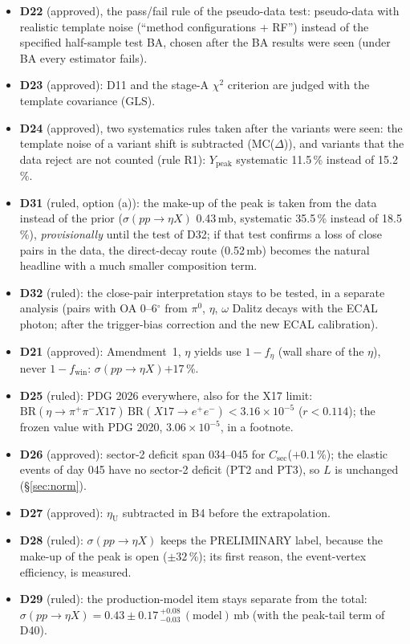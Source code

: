 \documentclass[11pt,a4paper]{article}
\newcommand{\piz}{\ensuremath{\pi^{0}}\xspace}
\newcommand{\ee}{\ensuremath{e^{+}e^{-}}\xspace}
\newcommand{\pipi}{\ensuremath{\pi^{+}\pi^{-}}\xspace}
\newcommand{\Ypeak}{\ensuremath{Y_{\mathrm{peak}}}\xspace}
\newcommand{\Csec}{\ensuremath{C_{\mathrm{sec}}}\xspace}
\newcommand{\feta}{\ensuremath{f_\eta}\xspace}
\newcommand{\fwin}{\ensuremath{f_{\mathrm{win}}}\xspace}
\newcommand{\sigeta}{\ensuremath{\sigma(pp\to\eta X)}\xspace}
\newcommand{\BRX}{\ensuremath{\mathrm{BR}(\eta\to\pipi X17)\,\mathrm{BR}(X17\to\ee)}\xspace}
\begin{document}
\begin{itemize}\setlength{\itemsep}{1pt}
\item \textbf{D22} (approved), the pass/fail rule of the pseudo-data test: pseudo-data with realistic template noise (``method
      configurations + RF'') instead of the specified half-sample test BA, chosen after the BA results were seen (under BA every estimator fails).
\item \textbf{D23} (approved): D11 and the stage-A $\chi^2$ criterion are judged with the template covariance (GLS).
\item \textbf{D24} (approved), two systematics rules taken after the variants were seen: the template noise of a variant shift is
      subtracted (MC($\Delta$)), and variants that the data reject are not counted (rule R1): \Ypeak systematic 11.5\,\% instead of 15.2\,\%.
\item \textbf{D31} (ruled, option (a)): the make-up of the peak is taken from the data instead of the prior (\sigeta 0.43\,mb, systematic
      35.5\,\% instead of 18.5\,\%), \emph{provisionally} until the test of D32; if that test confirms a loss of close pairs in the data, the
      direct-decay route (0.52\,mb) becomes the natural headline with a much smaller composition term.
\item \textbf{D32} (ruled): the close-pair interpretation stays to be tested, in a separate analysis (pairs with OA 0--6$^\circ$ from \piz,
      $\eta$, $\omega$ Dalitz decays with the ECAL photon; after the trigger-bias correction and the new ECAL calibration).
\item \textbf{D21} (approved): Amendment~1, $\eta$ yields use $1-\feta$ (wall share of the $\eta$), never $1-\fwin$: \sigeta $+17$\,\%.
\item \textbf{D25} (ruled): PDG 2026 everywhere, also for the X17 limit: $\BRX<3.16\times10^{-5}$ ($r<0.114$); the frozen value with PDG 2020,
      $3.06\times10^{-5}$, in a footnote.
\item \textbf{D26} (approved): sector-2 deficit span 034--045 for \Csec ($+0.1$\,\%); the elastic events of day 045 have no sector-2 deficit
      (PT2 and PT3), so $L$ is unchanged (\S\ref{sec:norm}).
\item \textbf{D27} (approved): $\eta_{\mathrm{U}}$ subtracted in B4 before the extrapolation.
\item \textbf{D28} (ruled): \sigeta keeps the PRELIMINARY label, because the make-up of the peak is open ($\pm32$\,\%); its first reason,
      the event-vertex efficiency, is measured.
\item \textbf{D29} (ruled): the production-model item stays separate from the total: $\sigeta=0.43\pm0.17\,^{+0.08}_{-0.03}\,(\mathrm{model})$\,mb (with the peak-tail term of D40).

\end{itemize}
\end{document}
